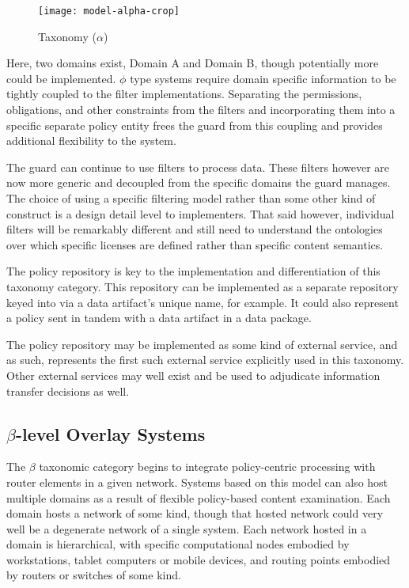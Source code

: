 \begin{figure}[!t]
\centering
\texttt{[image: model-alpha-crop]}
\caption{Taxonomy ($\alpha$)}
\label{fig:model:taxonomy-alpha}
\end{figure}

Here, two domains exist, Domain A and Domain B, though potentially more could be implemented.  $\phi$ type systems require domain specific information to be tightly coupled to the filter implementations.  Separating the permissions, obligations, and other constraints from the filters and incorporating them into a specific separate policy entity frees the guard from this coupling and provides additional flexibility to the system.

The guard can continue to use filters to process data.  These filters however are now more generic and decoupled from the specific domains the guard manages.  The choice of using a specific filtering model rather than some other kind of construct is a design detail level to implementers.  That said however, individual filters will be remarkably different and still need to understand the ontologies over which specific licenses are defined rather than specific content semantics.

The policy repository is key to the implementation and differentiation of this taxonomy category.  This repository can be implemented as a separate repository keyed into via a data artifact's unique name, for example.  It could also represent a policy sent in tandem with a data artifact in a data package.

The policy repository may be implemented as some kind of external service, and as such, represents the first such external service explicitly used in this taxonomy.  Other external services may well exist and be used to adjudicate information transfer decisions as well.

\subsection{$\beta$-level Overlay Systems}
The $\beta$ taxonomic category begins to integrate policy-centric processing with router elements in a given network.  Systems based on this model can also host multiple domains as a result of flexible policy-based content examination.  Each domain hosts a network of some kind, though that hosted network could very well be a degenerate network of a single system.  Each network hosted in a domain is hierarchical, with specific computational nodes embodied by workstations, tablet computers or mobile devices, and routing points embodied by routers or switches of some kind.

